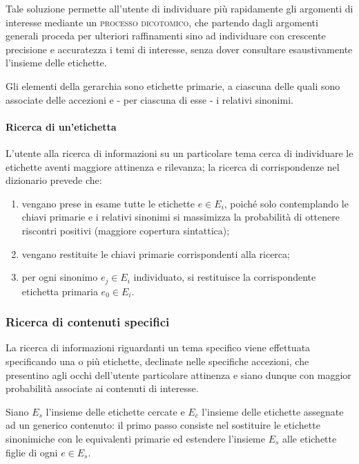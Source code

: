 \documentclass[10pt,a4paper,headinclude,footinclude,hidelinks]{scrreprt} %
\begin{document}
	Tale soluzione permette all'utente di individuare più rapidamente gli argomenti di interesse mediante un \textsc{processo dicotomico}, che partendo dagli argomenti generali proceda per ulteriori raffinamenti sino ad individuare con crescente precisione e accuratezza i temi di interesse, senza dover consultare esaustivamente l'insieme delle etichette.

	Gli elementi della gerarchia sono etichette primarie, a ciascuna delle quali sono associate delle accezioni e - per ciascuna di esse - i relativi sinonimi. 
	
	\paragraph{Ricerca di un'etichetta}
	L'utente alla ricerca di informazioni su un particolare tema cerca di individuare le etichette aventi maggiore attinenza e rilevanza; la ricerca di corrispondenze nel dizionario prevede che:
	\begin{enumerate}
	\item vengano prese in esame tutte le etichette $e \in E_i$, poiché solo contemplando le chiavi primarie e i relativi sinonimi si massimizza la probabilità di ottenere riscontri positivi (maggiore copertura sintattica);
	\item vengano restituite le chiavi primarie corrispondenti alla ricerca;
	\item per ogni sinonimo $e_j \in E_i$ individuato, si restituisce la corrispondente etichetta primaria $e_0 \in E_i$.
	\end{enumerate}

	\subsubsection{Ricerca di contenuti specifici}
	La ricerca di informazioni riguardanti un tema specifico viene effettuata specificando una o più etichette, declinate nelle specifiche accezioni, che presentino agli occhi dell'utente particolare attinenza e siano dunque con maggior probabilità associate ai contenuti di interesse.

	Siano $E_s$ l'insieme delle etichette cercate e $E_c$ l'insieme delle etichette assegnate ad un generico contenuto: il primo passo consiste nel sostituire le etichette sinonimiche con le equivalenti primarie ed estendere l'insieme $E_s$ alle etichette figlie di ogni $e \in E_s$.
\end{document}
